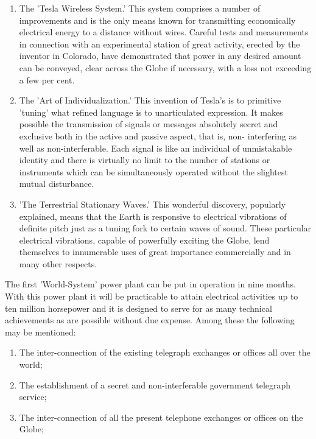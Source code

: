 \documentclass[a4paper,12pt,english,twoside,openright]{memoir}
\begin{document}
{\begin{enumerate}[1.]
\item The 'Tesla Wireless System.' This system comprises a number of improvements and is the 
only means known for transmitting economically electrical energy to a distance without wires.  
Careful tests and measurements in connection with an experimental station of great activity, 
erected by the inventor in Colorado, have demonstrated that power in any desired amount can be 
conveyed, clear across the Globe if necessary, with a loss not exceeding a few per cent.

\item The 'Art of Individualization.' This invention of Tesla's is to primitive 'tuning' what refined 
language is to unarticulated expression.  It makes possible the transmission of signals or 
messages absolutely secret and exclusive both in the active and passive aspect, that is, non-
interfering as well as non-interferable.  Each signal is like an individual of unmistakable identity 
and there is virtually no limit to the number of stations or instruments which can be 
simultaneously operated without the slightest mutual disturbance.

\item 'The Terrestrial Stationary Waves.' This wonderful discovery, popularly explained, means that 
the Earth is responsive to electrical vibrations of definite pitch just as a tuning fork to certain 
waves of sound.  These particular electrical vibrations, capable of powerfully exciting the Globe, 
lend themselves to innumerable uses of great importance commercially and in many other 
respects.
\end{enumerate}

The first 'World-System' power plant can be put in operation in nine months.  With this power 
plant it will be practicable to attain electrical activities up to ten million horsepower and it is 
designed to serve for as many technical achievements as are possible without due expense.  
Among these the following may be mentioned:
\begin{enumerate}[(1)]
\item The inter-connection of the existing telegraph exchanges or offices all over the world;

\item The establishment of a secret and non-interferable government telegraph service;

\item The inter-connection of all the present telephone exchanges or offices on the Globe;


\end{enumerate}}
\end{document}
